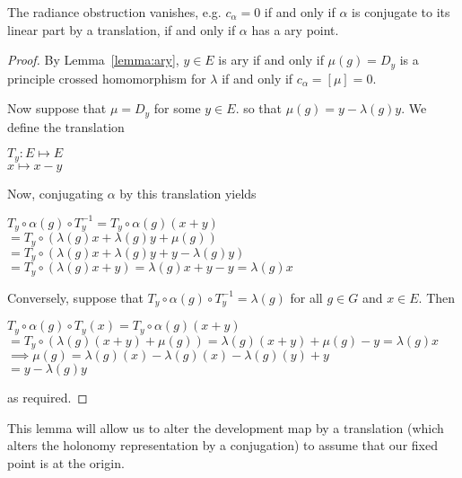 \begin{lemma}
    The radiance obstruction vanishes, e.g. $c_{\alpha} = 0$ if and only if
    $\alpha$ is conjugate to its linear part by a translation, if and only if $\alpha$
    has a ary point.
    \label{lemma:radiance-obstruction}
\end{lemma}
\begin{proof}
    By Lemma~\ref{lemma:ary}, $y \in E$ is ary if and only if
    $\mu(g) = D_y$ is a principle crossed homomorphism for $\lambda$ if and only
    if $c_{\alpha} = [\mu] =0$.

    Now suppose that $\mu =D_y$ for some $y \in E$. so that $\mu(g) = y -
        \lambda(g)y$. We define the translation
    \begin{center}
        $T_y : E \mapsto E$\\
        $ x \mapsto x-y$
    \end{center}
    Now, conjugating $\alpha$ by this translation yields
    \begin{center}
        $T_y \circ \alpha(g) \circ T_y^{-1} = T_y\circ \alpha(g)(x+y)$\\
        $= T_y\circ(\lambda(g)x  + \lambda(g)y + \mu(g))$\\
        $= T_y \circ (\lambda(g)x + \lambda(g)y +y - \lambda(g)y)$\\
        $= T_y \circ (\lambda(g)x +y ) = \lambda(g)x +y-y = \lambda(g)x$
    \end{center}

    Conversely, suppose that $T_y \circ \alpha(g) \circ T_y^{-1} = \lambda(g)$ for
    all $g \in G$ and $x \in E$. Then
    \begin{center}
        $T_y \circ \alpha(g) \circ T_y(x) = T_y \circ \alpha(g)(x+y)$\\
        $= T_y \circ (\lambda(g)(x+y) + \mu(g)) = \lambda(g)(x+y)+\mu(g)-y = \lambda(g)x$\\
        $\implies \mu(g) = \lambda(g)(x) - \lambda(g)(x) - \lambda(g)(y) +y$\\
        $= y - \lambda(g)y$
    \end{center}
    as required.
\end{proof}

\begin{remark}
    This lemma will allow us to alter the development map by a translation (which
    alters the holonomy representation by a conjugation) to assume that our fixed
    point is at the origin.
\end{remark}


